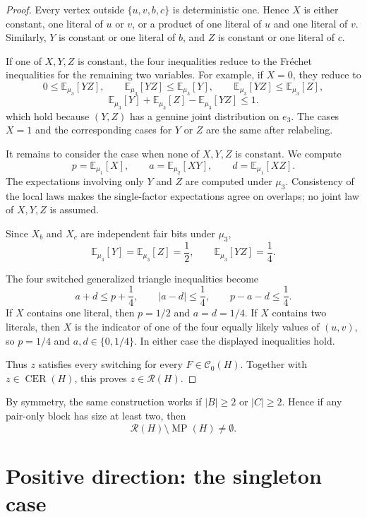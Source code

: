 \documentclass[11pt]{article}
\theoremstyle{definition}
\theoremstyle{remark}
\newcommand{\MP}{\operatorname{MP}}
\newcommand{\CER}{\operatorname{CER}}
\newcommand{\Rall}{\mathcal{R}}
\newcommand{\E}{\mathbb{E}}
\begin{document}
\begin{editedaiblock}
\begin{proof}
Every vertex outside $\{u,v,b,c\}$ is deterministic one. Hence $X$ is either constant, one literal of $u$ or $v$, or a product of one literal of $u$ and one literal of $v$. Similarly, $Y$ is constant or one literal of $b$, and $Z$ is constant or one literal of $c$.

If one of $X,Y,Z$ is constant, the four inequalities reduce to the Fr\'echet inequalities for the remaining two variables. For example, if $X=0$, they reduce to
\[
0\le \E_{\mu_3}[YZ],\qquad
\E_{\mu_3}[YZ]\le \E_{\mu_3}[Y],\qquad
\E_{\mu_3}[YZ]\le \E_{\mu_3}[Z],
\]
\[
\E_{\mu_3}[Y]+\E_{\mu_3}[Z]-\E_{\mu_3}[YZ]\le1.
\]
which hold because $(Y,Z)$ has a genuine joint distribution on $e_3$. The cases $X=1$ and the corresponding cases for $Y$ or $Z$ are the same after relabeling.

It remains to consider the case when none of $X,Y,Z$ is constant. We compute
\[
p=\E_{\mu_1}[X],\qquad
a=\E_{\mu_2}[XY],\qquad
d=\E_{\mu_1}[XZ].
\]
The expectations involving only $Y$ and $Z$ are computed under $\mu_3$.
Consistency of the local laws makes the single-factor expectations agree on overlaps; no joint law of $X,Y,Z$ is assumed.  

Since $X_b$ and $X_c$ are independent fair bits under $\mu_3$,
\[
\E_{\mu_3}[Y]=\E_{\mu_3}[Z]=\frac12,\qquad
\E_{\mu_3}[YZ]=\frac14.
\]




The four switched generalized triangle inequalities become
\[
a+d\le p+\frac14,\qquad
|a-d|\le\frac14,\qquad
p-a-d\le\frac14.
\]
If $X$ contains one literal, then $p=1/2$ and $a=d=1/4$. If $X$ contains two literals, then $X$ is the indicator of one of the four equally likely values of $(u,v)$, so $p=1/4$ and $a,d\in\{0,1/4\}$. In either case the displayed inequalities hold.

Thus $z$ satisfies every switching for every $F\in\mathcal C_0(H)$. Together with $z\in\CER(H)$, this proves $z\in\Rall(H)$.
\end{proof}

By symmetry, the same construction works if $|B|\ge2$ or $|C|\ge2$. Hence if any pair-only block has size at least two, then
\[
\Rall(H)\setminus\MP(H)\neq\emptyset.
\]
\end{editedaiblock}



\section{Positive direction: the singleton case}\label{sec:positive}
\end{document}
